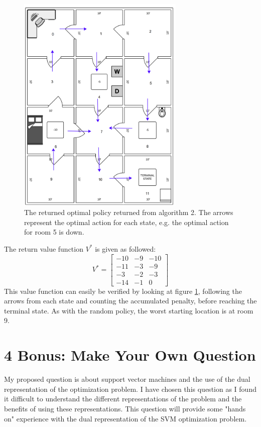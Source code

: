 \documentclass{article}
\begin{document}
\begin{figure}[H]
\centering
  \includegraphics[width=8cm]{fig/apartment.png}
\caption{\label{fig:1} The returned optimal policy returned from algorithm 2. The arrows represent the optimal action for each state, e.g. the optimal action for room 5 is down.}
\end{figure}

The return value function $V^*$ is given as followed:
\begin{equation}
V^* = 
\begin{bmatrix}
-10 & -9 & - 10 \\
-11 & -3 & -9 \\
-3 & -2 & -3 \\
-14 & -1 & 0
\end{bmatrix}
\end{equation}
This value function can easily be verified by looking at figure \ref{fig:1}, following the arrows from each state and counting the accumulated penalty, before reaching the terminal state. As with the random policy,  the worst starting location is at room 9.
\section{4 Bonus: Make Your Own Question}
My proposed question is about support vector machines and the use of the dual representation of the optimization problem. I have chosen this question as I found it difficult to understand the different representations of the problem and the benefits of using these representations.  This question will provide some "hands on" experience with the dual representation of the SVM optimization problem.
\end{document}
